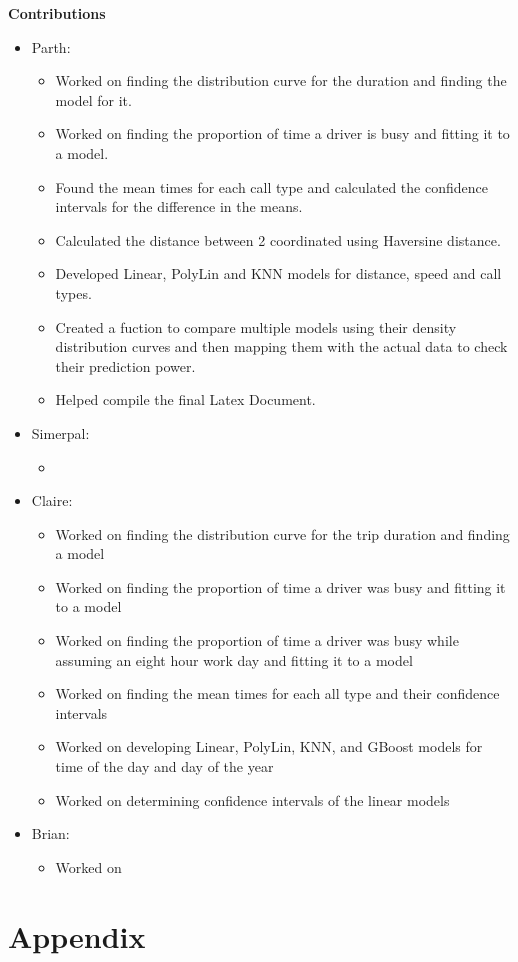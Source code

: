 \documentclass[11pt]{article}
\begin{document}
\textbf{Contributions}
\begin{itemize}
	\item Parth: \begin{itemize}
		\item Worked on finding the distribution curve for the duration and finding the model for it.
		\item Worked on finding the proportion of time a driver is busy and fitting it to a model.
		\item Found the mean times for each call type and calculated the confidence intervals for the difference in the means.
		\item Calculated the distance between 2 coordinated using Haversine distance.
		\item Developed Linear, PolyLin and KNN models for distance, speed and call types. 
		\item Created a fuction to compare multiple models using their density distribution curves and then mapping them with the actual data to check their prediction power.
		\item Helped compile the final Latex Document.
	\end{itemize}
	\item Simerpal: \begin{itemize}
		\item
	\end{itemize}
	\item Claire: \begin{itemize}
		\item Worked on finding the distribution curve for the trip duration and finding a model 
		\item Worked on finding the proportion of time a driver was busy and fitting it to a model
		\item Worked on finding the proportion of time a driver was busy while assuming an eight hour work day and fitting it to a model
		\item Worked on finding the mean times for each all type and their confidence intervals
		\item Worked on developing Linear, PolyLin, KNN, and GBoost models for time of the day and day of the year
		\item Worked on determining confidence intervals of the linear models
	\end{itemize}
	\item Brian:\begin{itemize}
		\item Worked on
	\end{itemize}
\end{itemize}

\appendix
\section*{Appendix}

\end{document}
